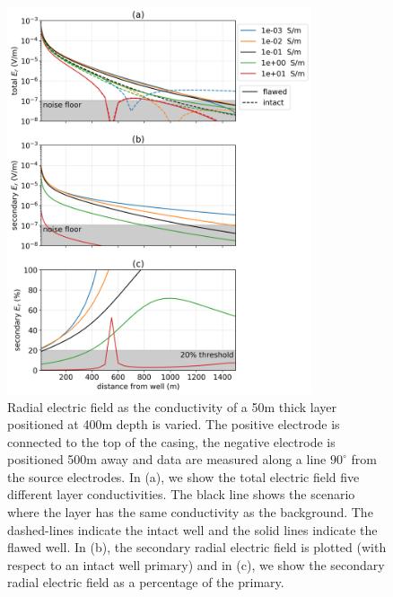 \begin{figure}
    \begin{center}
    \includegraphics[width=0.8\textwidth]{figures/integrity_layer.png}
    \end{center}
\caption{
    Radial electric field as the conductivity of a 50m thick layer positioned at 400m depth is varied.
    The positive electrode is connected to the top of the casing, the negative electrode
    is positioned 500m away and data are measured along a line $90^\circ$ from the
    source electrodes. In (a), we show the total electric field five different layer conductivities.
    The black line shows the scenario where the layer has the same conductivity as the background.
    The dashed-lines indicate the intact well and the solid lines indicate the flawed well.
    In (b), the secondary radial electric field is plotted (with respect to an intact well primary)
    and in (c), we show the
    secondary radial electric field as a percentage of the primary.
}
\label{fig:integrity_layer}
\end{figure}
